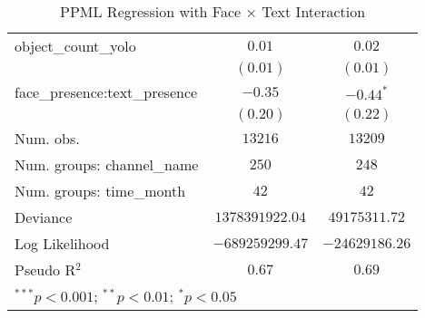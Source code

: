 \begin{table}
\begin{center}
\begin{tabular}{l c c}
object\_count\_yolo           & $0.01$          & $0.02$         \\
                              & $(0.01)$        & $(0.01)$       \\
face\_presence:text\_presence & $-0.35$         & $-0.44^{*}$    \\
                              & $(0.20)$        & $(0.22)$       \\
\hline
Num. obs.                     & $13216$         & $13209$        \\
Num. groups: channel\_name    & $250$           & $248$          \\
Num. groups: time\_month      & $42$            & $42$           \\
Deviance                      & $1378391922.04$ & $49175311.72$  \\
Log Likelihood                & $-689259299.47$ & $-24629186.26$ \\
Pseudo R$^2$                  & $0.67$          & $0.69$         \\
\hline
\multicolumn{3}{l}{\scriptsize{$^{***}p<0.001$; $^{**}p<0.01$; $^{*}p<0.05$}}
\end{tabular}
\caption{PPML Regression with Face × Text Interaction}
\label{tab:ppml_interaction}
\end{center}
\end{table}


